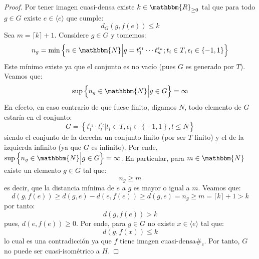 \documentclass[12pt]{report}
\newcounter{it}
\theoremstyle{largebreak}
\newcommand\contradiction{\ensuremath{\#_c}}
\newcommand{\bbm}[1]{\ensuremath{\mathbbm{#1}}}
\newcommand{\gen}[1]{\ensuremath{\langle#1\rangle}}
\begin{document}
\begin{proof}
        Por tener imagen cuasi-densa existe $k\in\bbm{R}_{\geq0}$ tal que para todo $g\in G$ existe $e\in\gen{e}$ que cumple:
        \begin{equation*}
            d_G(g,f(e))\leq k
        \end{equation*}
        Sea $m=\lceil k\rceil+1$. Considere $g\in G$ y tomemos:
        \begin{equation*}
            n_g=\min\left\{n\in\bbm{N}\Big|g=t_1^{\epsilon_1}\cdots t_n^{\epsilon_n};t_i\in T, \epsilon_i\in\left\{-1,1\right\} \right\}
        \end{equation*}
        Este mínimo existe ya que el conjunto es no vacío (pues $G$ es generado por $T$). Veamos que:
        \begin{equation*}
            \sup\left\{n_g\in\bbm{N}\Big|g\in G \right\}=\infty
        \end{equation*}
        En efecto, en caso contrario de que fuese finito, digamos $N$, todo elemento de $G$ estaría en el conjunto:
        \begin{equation*}
            G=\left\{t_1^{\epsilon_1}\cdot t_l^{\epsilon_l}\Big|t_i\in T, \epsilon_i\in\left\{-1,1\right\},l\leq N \right\}
        \end{equation*}
        siendo el conjunto de la derecha un conjunto finito (por ser $T$ finito) y el de la izquierda infinito (ya que $G$ es infinito). Por ende, $\sup\left\{n_g\in\bbm{N}\Big|g\in G \right\}=\infty$. En particular, para $m\in\bbm{N}$ existe un elemento $g\in G$ tal que:
        \begin{equation*}
            n_g\geq m
        \end{equation*}
        es decir, que la distancia mínima de $e$ a $g$ es mayor o igual a $m$. Veamos que:
        \begin{equation*}
            d(g,f(e))\geq d(g,e)-d(e,f(e))\geq d(g,e)=n_g\geq m=\lceil k\rceil+1>k
        \end{equation*}
        por tanto:
        \begin{equation*}
            d(g,f(e))>k
        \end{equation*}
        pues, $d(e,f(e))\geq 0$. Por ende, para $g\in G$ no existe $x\in\gen{e}$ tal que:
        \begin{equation*}
            d(g,f(x))\leq k
        \end{equation*}
        lo cual es una contradicción ya que $f$ tiene imagen cuasi-densa\contradiction. Por tanto, $G$ no puede ser cuasi-isométrico a $H$.
    \end{proof}
\end{document}
